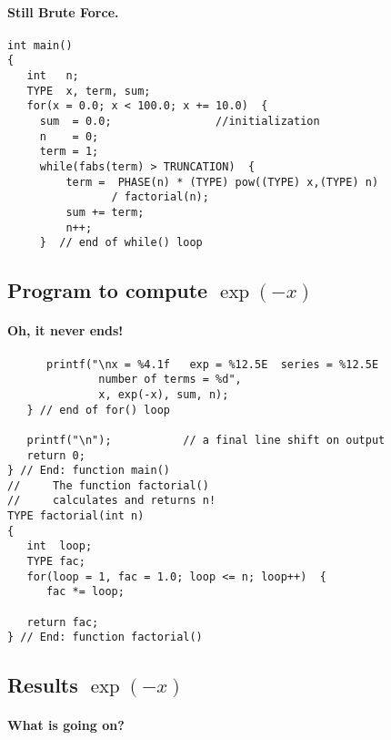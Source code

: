 \documentclass[%
oneside,                 %
final,                   %
10pt]{article}
\begin{document}
\paragraph{Still Brute Force.}
\begin{verbatim}
int main()
{
   int   n;
   TYPE  x, term, sum;
   for(x = 0.0; x < 100.0; x += 10.0)  {
     sum  = 0.0;                //initialization
     n    = 0;
     term = 1;
     while(fabs(term) > TRUNCATION)  {
         term =  PHASE(n) * (TYPE) pow((TYPE) x,(TYPE) n)
                / factorial(n);
         sum += term;
         n++;
     }  // end of while() loop
\end{verbatim}



\subsection*{Program to compute $\exp{(-x)}$}


\paragraph{Oh, it never ends!}
\begin{verbatim}
      printf("\nx = %4.1f   exp = %12.5E  series = %12.5E
              number of terms = %d",
              x, exp(-x), sum, n);
   } // end of for() loop

   printf("\n");           // a final line shift on output
   return 0;
} // End: function main()
//     The function factorial()
//     calculates and returns n!
TYPE factorial(int n)
{
   int  loop;
   TYPE fac;
   for(loop = 1, fac = 1.0; loop <= n; loop++)  {
      fac *= loop;

   return fac;
} // End: function factorial()
\end{verbatim}



\subsection*{Results $\exp{(-x)}$}


\paragraph{What is going on?}
\end{document}

